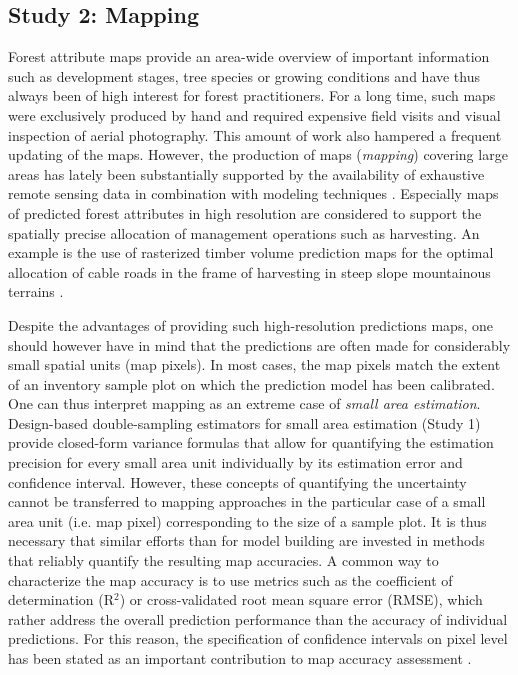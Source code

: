 \subsection{Study 2: Mapping} %
\label{sec:study2}


Forest attribute maps provide an area-wide overview of important information such as development stages, tree species or growing conditions and have thus always been of high interest for forest practitioners. For a long time, such maps were exclusively produced by hand and required expensive field visits and visual inspection of aerial photography. This amount of work also hampered a frequent updating of the maps. However, the production of maps (\textit{mapping}) covering large areas has lately been substantially supported by the availability of exhaustive remote sensing data in combination with modeling techniques \citep{brosofske2014}. Especially maps of predicted forest attributes in high resolution are considered to support the spatially precise allocation of management operations such as harvesting. An example is the use of rasterized timber volume prediction maps for the optimal allocation of cable roads in the frame of harvesting in steep slope mountainous terrains \citep{bont2012, bont2015}.\par

Despite the advantages of providing such high-resolution predictions maps, one should however have in mind that the predictions are often made for considerably small spatial units (map pixels). In most cases, the map pixels match the extent of an inventory sample plot on which the prediction model has been calibrated. One can thus interpret mapping as an extreme case of \textit{small area estimation}. Design-based double-sampling estimators for small area estimation (Study 1) provide closed-form variance formulas that allow for quantifying the estimation precision for every small area unit individually by its estimation error and confidence interval. However, these concepts of quantifying the uncertainty cannot be transferred to mapping approaches in the particular case of a small area unit (i.e. map pixel) corresponding to the size of a sample plot. It is thus necessary that similar efforts than for model building are invested in methods that reliably quantify the resulting map accuracies. A common way to characterize the map accuracy is to use metrics such as the coefficient of determination (R$^2$) or cross-validated root mean square error (RMSE), which rather address the overall prediction performance than the accuracy of individual predictions. For this reason, the specification of confidence intervals on pixel level has been stated as an important contribution to map accuracy assessment \citep{mcroberts2010a}.\par

